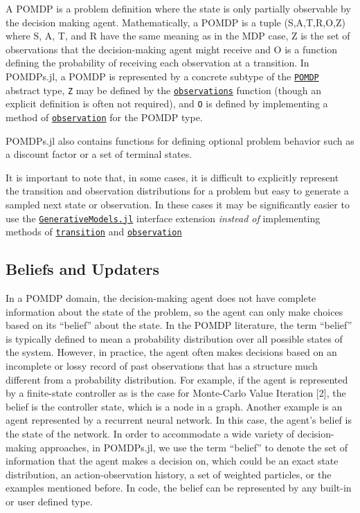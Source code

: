 \documentclass[12pt,]{article}
\begin{document}
A POMDP is a problem definition where the state is only partially
observable by the decision making agent. Mathematically, a POMDP is a
tuple (S,A,T,R,O,Z) where S, A, T, and R have the same meaning as in the
MDP case, Z is the set of observations that the decision-making agent
might receive and O is a function defining the probability of receiving
each observation at a transition. In POMDPs.jl, a POMDP is represented
by a concrete subtype of the \href{api.md\#POMDPs.POMDP}{\texttt{POMDP}}
abstract type, \texttt{Z} may be defined by the
\href{api.md\#POMDPs.observations}{\texttt{observations}} function
(though an explicit definition is often not required), and \texttt{O} is
defined by implementing a method of
\href{api.md\#POMDPs.observation}{\texttt{observation}} for the POMDP
type.

POMDPs.jl also contains functions for defining optional problem behavior
such as a discount factor or a set of terminal states.

It is important to note that, in some cases, it is difficult to
explicitly represent the transition and observation distributions for a
problem but easy to generate a sampled next state or observation. In
these cases it may be significantly easier to use the
\href{https://github.com/JuliaPOMDP/GenerativeModels.jl}{\texttt{GenerativeModels.jl}}
interface extension \emph{instead of} implementing methods of
\href{api.md\#POMDPs.transition}{\texttt{transition}} and
\href{api.md\#POMDPs.observation}{\texttt{observation}}

\subsection{Beliefs and Updaters}\label{beliefs-and-updaters}

In a POMDP domain, the decision-making agent does not have complete
information about the state of the problem, so the agent can only make
choices based on its ``belief'' about the state. In the POMDP
literature, the term ``belief'' is typically defined to mean a
probability distribution over all possible states of the system.
However, in practice, the agent often makes decisions based on an
incomplete or lossy record of past observations that has a structure
much different from a probability distribution. For example, if the
agent is represented by a finite-state controller as is the case for
Monte-Carlo Value Iteration {[}2{]}, the belief is the controller state,
which is a node in a graph. Another example is an agent represented by a
recurrent neural network. In this case, the agent's belief is the state
of the network. In order to accommodate a wide variety of
decision-making approaches, in POMDPs.jl, we use the term ``belief'' to
denote the set of information that the agent makes a decision on, which
could be an exact state distribution, an action-observation history, a
set of weighted particles, or the examples mentioned before. In code,
the belief can be represented by any built-in or user defined type.
\end{document}
